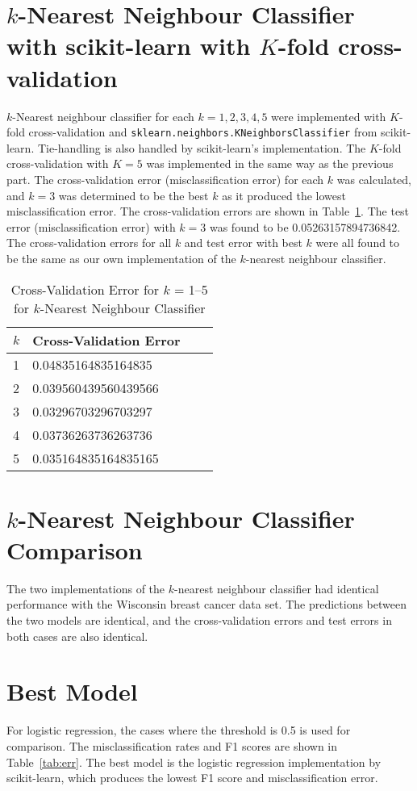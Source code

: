 \documentclass[12pt]{article}
\begin{document}
\section*{$k$-Nearest Neighbour Classifier with scikit-learn with $K$-fold cross-validation}
$k$-Nearest neighbour classifier for each $k = 1,2,3,4,5$ were implemented with $K$-fold cross-validation and \texttt{sklearn.neighbors.KNeighborsClassifier} from scikit-learn. Tie-handling is also handled by scikit-learn's implementation. The $K$-fold cross-validation with $K = 5$ was implemented in the same way as the previous part. The cross-validation error (misclassification error) for each $k$ was calculated, and $k = 3$ was determined to be the best $k$ as it produced the lowest misclassification error. The cross-validation errors are shown in Table~\ref{tab:kneigh_scikit}. The test error (misclassification error) with $k = 3$ was found to be 0.05263157894736842. The cross-validation errors for all $k$ and test error with best $k$ were all found to be the same as our own implementation of the $k$-nearest neighbour classifier.

\begin{table}[htp]
\centering
\caption{Cross-Validation Error for $k$ = 1--5 for $k$-Nearest Neighbour Classifier}\label{tab:kneigh_scikit}
\begin{tabular}{|l|l|l|l|}
	\hline
	$k$	& Cross-Validation Error	\\ \hline\hline
	1  	& 0.04835164835164835		\\ \hline
	2  	& 0.039560439560439566		\\ \hline
	3  	& 0.03296703296703297		\\ \hline
	4  	& 0.03736263736263736		\\ \hline
	5  	& 0.035164835164835165		\\ \hline
\end{tabular}
\end{table}

\section*{$k$-Nearest Neighbour Classifier Comparison}
The two implementations of the $k$-nearest neighbour classifier had identical performance with the Wisconsin breast cancer data set. The predictions between the two models are identical, and the cross-validation errors and test errors in both cases are also identical.

\section*{Best Model}
For logistic regression, the cases where the threshold is 0.5 is used for comparison. The misclassification rates and F1 scores are shown in Table~\ref{tab:err}. The best model is the logistic regression implementation by scikit-learn, which produces the lowest F1 score and misclassification error.
\end{document}

